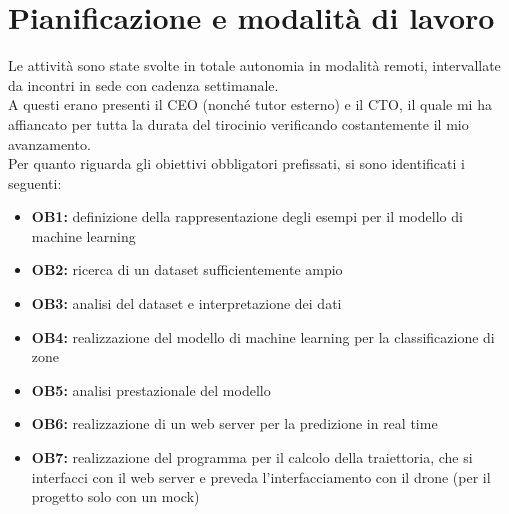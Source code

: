 \section{Pianificazione e modalità di lavoro}
Le attività sono state svolte in totale autonomia in modalità remoti, intervallate da incontri in sede con cadenza settimanale.\\
A questi erano presenti il CEO (nonché tutor esterno) e il CTO, il quale mi ha affiancato per tutta la durata del tirocinio verificando
costantemente il mio avanzamento.\\
Per quanto riguarda gli obiettivi obbligatori prefissati, si sono identificati i seguenti:
\begin{itemize}
		\item \textbf{OB1:} definizione della rappresentazione degli esempi per il modello di machine learning
		\item \textbf{OB2:} ricerca di un dataset sufficientemente ampio
		\item \textbf{OB3:} analisi del dataset e interpretazione dei dati
		\item \textbf{OB4:} realizzazione del modello di machine learning per la classificazione di zone
		\item \textbf{OB5:} analisi prestazionale del modello
		\item \textbf{OB6:} realizzazione di un web server per la predizione in real time
		\item \textbf{OB7:} realizzazione del programma per il calcolo della traiettoria, che si interfacci con il web server e preveda l'interfacciamento con il drone (per il progetto solo con un mock)
\end{itemize}
